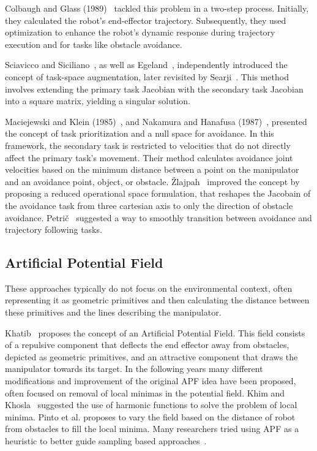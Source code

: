 \documentclass[letterpaper, 10 pt, conference]{ieeeconf}  %
\begin{document}
Colbaugh and Glass (1989)~\cite{c31, c32} tackled this problem in a two-step process. Initially, they calculated the robot's end-effector trajectory. Subsequently, they used optimization to enhance the robot's dynamic response during trajectory execution and for tasks like obstacle avoidance.

Sciavicco and Siciliano~\cite{c34, c35}, as well as Egeland~\cite{c36}, independently introduced the concept of task-space augmentation, later revisited by Searji~\cite{c37}. This method involves extending the primary task Jacobian with the secondary task Jacobian into a square matrix, yielding a singular solution.

Maciejewski and Klein (1985)~\cite{c29}, and Nakamura and Hanafusa (1987)~\cite{c38}, presented the concept of task prioritization and a null space for avoidance. In this framework, the secondary task is restricted to velocities that do not directly affect the primary task's movement. Their method calculates avoidance joint velocities based on the minimum distance between a point on the manipulator and an avoidance point, object, or obstacle. Žlajpah~\cite{c41} improved the concept by proposing a reduced operational space formulation, that reshapes the Jacobain of the avoidance task from three cartesian axis to only the direction of obstacle avoidance. Petrič~\cite{c42} suggested a way to smoothly transition between avoidance and trajectory following tasks.

\subsection{Artificial Potential Field}

These approaches typically do not focus on the environmental context, often representing it as geometric primitives and then calculating the distance between these primitives and the lines describing the manipulator.

Khatib~\cite{c33} proposes the concept of an Artificial Potential Field. This field consists of a repulsive component that deflects the end effector away from obstacles, depicted as geometric primitives, and an attractive component that draws the manipulator towards its target. In the following years many different modifications and improvement of the original APF idea have been proposed, often focused on removal of local minimas in the potential field. Khim and Khosla~\cite{c40} suggested the use of harmonic functions to solve the problem of local minima. Pinto et al. \cite{c43} proposes to vary the field based on the distance of robot from obstacles to fill the local minima. Many researchers tried using APF as a heuristic to better guide sampling based approaches~\cite{c45, c46, c47}.
\end{document}
